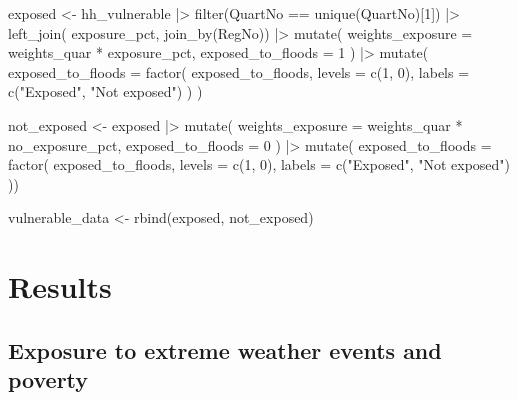 \documentclass[
  letterpaper,
  DIV=11,
  numbers=noendperiod]{scrartcl}
\newenvironment{Shaded}{}{}
\newcommand{\AttributeTok}[1]{\textcolor[rgb]{0.84,0.23,0.29}{#1}}
\newcommand{\DecValTok}[1]{\textcolor[rgb]{0.00,0.36,0.77}{#1}}
\newcommand{\FunctionTok}[1]{\textcolor[rgb]{0.44,0.26,0.76}{#1}}
\newcommand{\NormalTok}[1]{\textcolor[rgb]{0.14,0.16,0.18}{#1}}
\newcommand{\OtherTok}[1]{\textcolor[rgb]{0.44,0.26,0.76}{#1}}
\newcommand{\SpecialCharTok}[1]{\textcolor[rgb]{0.00,0.36,0.77}{#1}}
\newcommand{\StringTok}[1]{\textcolor[rgb]{0.01,0.18,0.38}{#1}}
\begin{document}
\begin{Shaded}
\begin{Highlighting}[]
\NormalTok{exposed }\OtherTok{\textless{}{-}}\NormalTok{ hh\_vulnerable }\SpecialCharTok{|\textgreater{}} 
  \FunctionTok{filter}\NormalTok{(QuartNo }\SpecialCharTok{==} \FunctionTok{unique}\NormalTok{(QuartNo)[}\DecValTok{1}\NormalTok{]) }\SpecialCharTok{|\textgreater{}} 
  \FunctionTok{left\_join}\NormalTok{(}
\NormalTok{    exposure\_pct, }
    \FunctionTok{join\_by}\NormalTok{(RegNo)) }\SpecialCharTok{|\textgreater{}} 
  \FunctionTok{mutate}\NormalTok{(}
    \AttributeTok{weights\_exposure =}\NormalTok{ weights\_quar }\SpecialCharTok{*}\NormalTok{ exposure\_pct,}
    \AttributeTok{exposed\_to\_floods =} \DecValTok{1}
\NormalTok{  ) }\SpecialCharTok{|\textgreater{}} 
  \FunctionTok{mutate}\NormalTok{(}
    \AttributeTok{exposed\_to\_floods =} \FunctionTok{factor}\NormalTok{(}
\NormalTok{      exposed\_to\_floods,}
      \AttributeTok{levels =} \FunctionTok{c}\NormalTok{(}\DecValTok{1}\NormalTok{, }\DecValTok{0}\NormalTok{),}
      \AttributeTok{labels =} \FunctionTok{c}\NormalTok{(}\StringTok{"Exposed"}\NormalTok{, }\StringTok{"Not exposed"}\NormalTok{)}
\NormalTok{    )}
\NormalTok{  )}

\NormalTok{not\_exposed }\OtherTok{\textless{}{-}}\NormalTok{ exposed }\SpecialCharTok{|\textgreater{}} 
  \FunctionTok{mutate}\NormalTok{(}
    \AttributeTok{weights\_exposure =}\NormalTok{ weights\_quar }\SpecialCharTok{*}\NormalTok{ no\_exposure\_pct,}
    \AttributeTok{exposed\_to\_floods =} \DecValTok{0}
\NormalTok{  ) }\SpecialCharTok{|\textgreater{}} 
  \FunctionTok{mutate}\NormalTok{(}
    \AttributeTok{exposed\_to\_floods =} \FunctionTok{factor}\NormalTok{(}
\NormalTok{      exposed\_to\_floods,}
      \AttributeTok{levels =} \FunctionTok{c}\NormalTok{(}\DecValTok{1}\NormalTok{, }\DecValTok{0}\NormalTok{),}
      \AttributeTok{labels =} \FunctionTok{c}\NormalTok{(}\StringTok{"Exposed"}\NormalTok{, }\StringTok{"Not exposed"}\NormalTok{)}
\NormalTok{    ))}

\NormalTok{vulnerable\_data }\OtherTok{\textless{}{-}} \FunctionTok{rbind}\NormalTok{(exposed, not\_exposed)}
\end{Highlighting}
\end{Shaded}

\section{Results}\label{results}

\subsection{Exposure to extreme weather events and
poverty}\label{exposure-to-extreme-weather-events-and-poverty}
\end{document}
